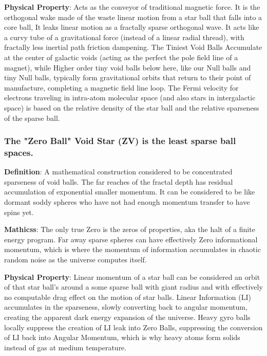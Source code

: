 \documentclass[11pt,a4paper]{article}
\begin{document}
    \noindent\textbf{Physical Property}: Acts as the conveyor of traditional magnetic force. It is the orthogonal wake made of the waste linear motion from a star ball that falls into a core ball, It leaks linear motion as a fractally sparse orthogonal wave. It acts like a curvy tube of a gravitational force (instead of a linear radial thread), with fractally less inertial path friction dampening. The Tiniest Void Balls Accumulate at the center of galactic voids (acting as the perfect the pole field line of a magnet), while Higher order tiny void balls below here, like our Null balls and tiny Null balls, typically form gravitational orbits that return to their point of manufacture, completing a magnetic field line loop. The Fermi velocity for electrons traveling in intra-atom molecular space (and also stars in intergalactic space) is based on the relative density of the star ball and the relative sparseness of the sparse ball. 




    \subsubsection
    { The "Zero Ball" Void Star (ZV) is the least sparse ball spaces. 
    }
    \noindent\textbf{Definition}: A mathematical construction considered to be concentrated sparseness of void balls. The far reaches of the fractal depth has residual accumulation of exponential smaller momentum. It can be considered to be like dormant soddy spheres who have not had enough momentum transfer to have spins yet.

    \noindent\textbf{Mathicss}: The only true Zero is the  zeros of properties, aka the halt of a finite energy program. Far away sparse spheres can have effectively  Zero informational momentum, which is where the momentum of information accumulates in chaotic random noise as the universe computes itself.

    \noindent\textbf{Physical Property}: Linear momentum of a star ball can be considered an orbit of that star ball's around a some sparse ball with giant radius and with effectively no computable drag effect on the motion of star balls. Linear Information (LI) accumulates in the sparseness, slowly converting back to angular momentum, creating the apparent dark energy expansion of the universe. Heavy gyro balls locally suppress the creation of LI leak into Zero Balls, suppressing the conversion of LI back into Angular Momentum, which is why heavy atoms form solids instead of gas at medium temperature. 
\end{document}

